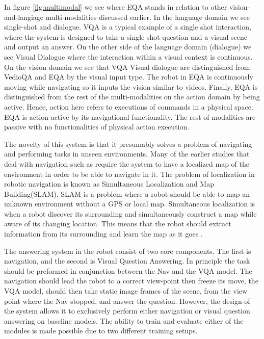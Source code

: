 In figure \ref{fig:multimodal} we see where EQA stands in relation to other vision-and-langiage multi-modalities discussed earlier. In the language domain we see single-shot and  dialogue. VQA is a typical example of a single shot interaction, where the system is designed to take a single shot question and a visual scene and output an answer. On the other side of the language domain (dialogue) we see Visual Dialogue where the interaction within a visual context is continuous. On the vision domain we see that VQA Visual dialogue  are distinguished from VedioQA and EQA by the visual input type. The robot in EQA is continuously moving while navigating so it inputs the vision similar to videos. Finally, EQA is distinguished from the rest of the multi-modalities on the action domain by being active. Hence, action here refers to executions of commands in a physical space. EQA is action-active by its navigational functionality. The rest of modalities are passive with no functionalities of physical action execution. 


The novelty of this system is that it presumably solves a problem of navigating and performing tasks in unseen environments. Many of the earlier studies that deal with navigation such as \cite{kruijff2007situated}\cite{lauria2001training} require the system to have a localized map of the environment in order to be able to navigate in it. The problem of localization in robotic navigation is known as Simultaneous Localization and Map Building(SLAM). SLAM is a problem where a robot should be able to  map an unknown environment without a GPS or local map. Simultaneous localization is when a robot discover its surrounding and simultaneously construct a map while aware of its changing location. This means that the robot should extract information from its surrounding and learn the map as it goes \cite{grisetti2010tutorial} \cite{938381} \cite{8482266}. 


The answering system in the robot consist of two core components. The first is navigation, and the second is Visual Question Answering. In principle the task should be preformed in conjunction between the Nav and the VQA model. The navigation should lead the robot to a correct view-point then freeze its move, the VQA model, should then take static image frames of the scene, from the view point where the Nav stopped, and answer the question. 
However, the design of the system allows it to exclusively perform either navigation or visual question answering on baseline models. The ability to train and evaluate either of the modules is made possible due to two different training setups.


